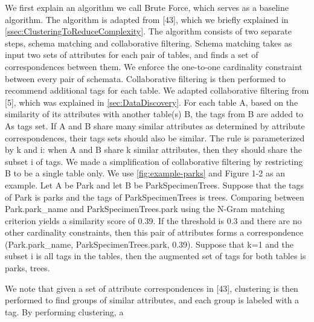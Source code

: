 We first explain an algorithm we call Brute Force, which serves as a baseline algorithm. The algorithm is adapted from \cite{Smith2011Unity}[43], which we briefly explained in \autoref{ssec:ClusteringToReduceComplexity}. The algorithm consists of two separate steps, schema matching and collaborative filtering. Schema matching takes as input two sets of attributes for each pair of tables, and finds a set of correspondences between them. We enforce the one-to-one cardinality constraint between every pair of schemata. Collaborative filtering is then performed to recommend additional tags for each table. We adapted collaborative filtering from \cite{conf/esws/EllefiBDT16}[5], which was explained in \autoref{sec:DataDiscovery}. For each table A, based on the similarity of its attributes with another table(s) B, the tags from B are added to As tags set. If A and B share many similar attributes as determined by attribute correspondences, their tags sets should also be similar. The rule is parameterized by k and i: when A and B share k similar attributes, then they should share the subset i of tags. We made a simplification of collaborative filtering by restricting B to be a single table only.
We use \autoref{fig:example-parks} and Figure 1-2 as an example. Let A be Park and let B be ParkSpecimenTrees. Suppose that the tags of Park is {parks} and the tags of ParkSpecimenTrees is {trees}. Comparing between Park.park\_name and ParkSpecimenTrees.park using the N-Gram matching criterion yields a similarity score of 0.39. If the threshold is 0.3 and there are no other cardinality constraints, then this pair of attributes forms a correspondence (Park.park\_name, ParkSpecimenTrees.park, 0.39). Suppose that k=1 and the subset i is all tags in the tables, then the augmented set of tags for both tables is {parks, trees}.


We note that given a set of attribute correspondences in \cite{Smith2011Unity}[43], clustering is then performed to find groups of similar attributes, and each group is labeled with a tag. By performing clustering, a

